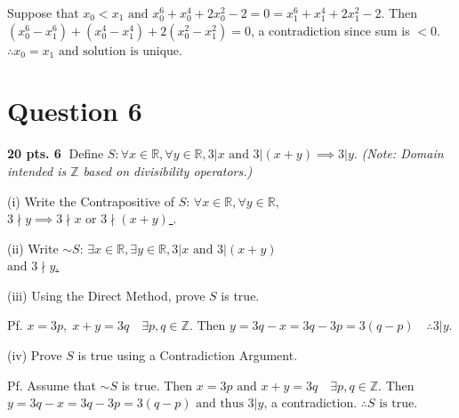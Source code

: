 \documentclass{article}
\begin{document}
\vspace{0.3cm}
\noindent Suppose that $x_0 < x_1 \text{ and } x_0^6 + x_0^4 + 2x_0^2 - 2 = 0 = x_1^6 + x_1^4 + 2x_1^2 - 2$. Then $(x_0^6 - x_1^6) + (x_0^4 - x_1^4) + 2(x_0^2 - x_1^2) = 0$, a contradiction since sum is $< 0$. \\
$\therefore x_0 = x_1 \text{ and solution is unique.}$

\vspace{0.5cm}

\section*{Question 6}
\textbf{20 pts. \textcircled{6}} Define $S: \forall x \in \mathbb{R}, \forall y \in \mathbb{R}, 3 | x \text{ and } 3 | (x+y) \implies 3 | y$. \textit{(Note: Domain intended is $\mathbb{Z}$ based on divisibility operators.)}

\vspace{0.3cm}
\noindent (i) Write the Contrapositive of $S$: \underline{ $\forall x \in \mathbb{R}, \forall y \in \mathbb{R},$ } \\
\hspace{0.5cm} \underline{ $3 \nmid y \implies 3 \nmid x \text{ or } 3 \nmid (x+y)$ }.

\vspace{0.3cm}
\noindent (ii) Write $\sim S$: \underline{ $\exists x \in \mathbb{R}, \exists y \in \mathbb{R}, 3 | x \text{ and } 3 | (x+y)$ } \\
\hspace{0.5cm} \underline{ $\text{and } 3 \nmid y$. }

\vspace{0.3cm}
\noindent (iii) Using the Direct Method, prove $S$ is true.

\vspace{0.3cm}
\noindent Pf. $x = 3p, \; x+y = 3q \quad \exists p, q \in \mathbb{Z}$. Then $y = 3q - x = 3q - 3p = 3(q-p) \quad \therefore 3 | y$.

\vspace{0.3cm}
\noindent (iv) Prove $S$ is true using a Contradiction Argument.

\vspace{0.3cm}
\noindent Pf. Assume that $\sim S$ is true. Then $x = 3p \text{ and } x+y = 3q \quad \exists p, q \in \mathbb{Z}$. Then $y = 3q - x = 3q - 3p = 3(q-p) \text{ and thus } 3 | y$, a contradiction. $\therefore S \text{ is true}$.
\end{document}
